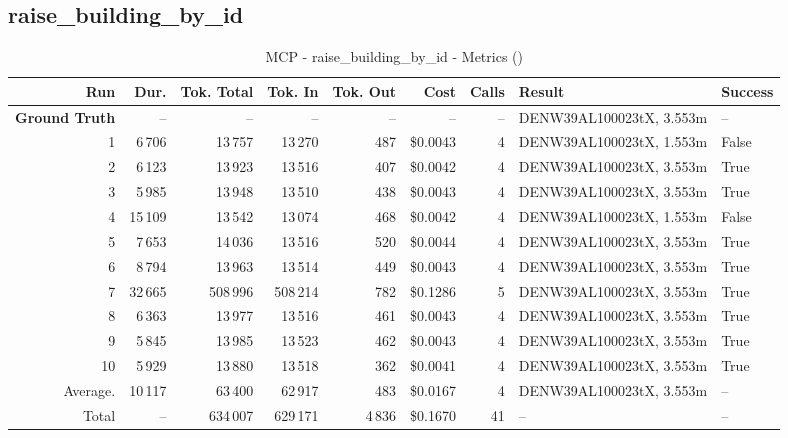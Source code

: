\documentclass[a4paper,11pt]{article}
\begin{document}
\clearpage
\subsection{raise\_building\_by\_id}

\begin{table}[ht]
\centering
\scriptsize
\caption{MCP - raise\_building\_by\_id - Metrics ()}
\label{tab:mcp\_raise\_building\_by\_id\_metrics\_}
\begin{tabular}{r r r r r r r p{3cm} l}
\hline
Run & Dur. & Tok. Total & Tok. In & Tok. Out & Cost & Calls & Result & Success \\
\hline
\textbf{Ground Truth} & -- & -- & -- & -- & -- & -- & DENW39AL100023tX, 3.553m & -- \\
\hline
1 & 6\,706 & 13\,757 & 13\,270 & 487 & \$0.0043 & 4 & DENW39AL100023tX, 1.553m & False \\
2 & 6\,123 & 13\,923 & 13\,516 & 407 & \$0.0042 & 4 & DENW39AL100023tX, 3.553m & True \\
3 & 5\,985 & 13\,948 & 13\,510 & 438 & \$0.0043 & 4 & DENW39AL100023tX, 3.553m & True \\
4 & 15\,109 & 13\,542 & 13\,074 & 468 & \$0.0042 & 4 & DENW39AL100023tX, 1.553m & False \\
5 & 7\,653 & 14\,036 & 13\,516 & 520 & \$0.0044 & 4 & DENW39AL100023tX, 3.553m & True \\
6 & 8\,794 & 13\,963 & 13\,514 & 449 & \$0.0043 & 4 & DENW39AL100023tX, 3.553m & True \\
7 & 32\,665 & 508\,996 & 508\,214 & 782 & \$0.1286 & 5 & DENW39AL100023tX, 3.553m & True \\
8 & 6\,363 & 13\,977 & 13\,516 & 461 & \$0.0043 & 4 & DENW39AL100023tX, 3.553m & True \\
9 & 5\,845 & 13\,985 & 13\,523 & 462 & \$0.0043 & 4 & DENW39AL100023tX, 3.553m & True \\
10 & 5\,929 & 13\,880 & 13\,518 & 362 & \$0.0041 & 4 & DENW39AL100023tX, 3.553m & True \\
\hline
Average. & 10\,117 & 63\,400 & 62\,917 & 483 & \$0.0167 & 4 & DENW39AL100023tX, 3.553m & -- \\
Total & -- & 634\,007 & 629\,171 & 4\,836 & \$0.1670 & 41 & -- & -- \\
\hline
\end{tabular}
\end{table}

\clearpage
\end{document}
